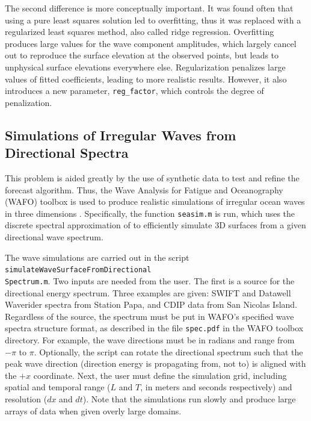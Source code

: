 \documentclass[11pt]{article}
\begin{document}
The second difference is more conceptually important.  It was found often that using a pure least squares solution led to overfitting, thus it was replaced with a regularized least squares method, also called ridge regression.  Overfitting produces large values for the wave component amplitudes, which largely cancel out to reproduce the surface elevation at the observed points, but leads to unphysical surface elevations everywhere else.  Regularization penalizes large values of fitted coefficients,  leading to more realistic results.  However, it also introduces a new parameter, \texttt{reg\_factor}, which controls the degree of penalization.

\subsection{Simulations of Irregular Waves from Directional Spectra}
This problem is aided greatly by the use of synthetic data to test and refine the forecast algorithm.  Thus, the Wave Analysis for Fatigue and Oceanography (WAFO) toolbox is used to produce realistic simulations of irregular ocean waves in three dimensions \citep{WAFO:2000}.  Specifically, the function \texttt{seasim.m} is run, which uses the discrete spectral approximation of \citet{Dietrich:1997} to efficiently simulate 3D surfaces from a given directional wave spectrum.

The wave simulations are carried out in the script \texttt{simulateWaveSurfaceFromDirectional\\Spectrum.m}.  Two inputs are needed from the user.  The first is a source for the directional energy spectrum.  Three examples are given: SWIFT and Datawell Waverider spectra from Station Papa, and CDIP data from San Nicolas Island.  Regardless of the source, the spectrum must be put in WAFO's specified wave spectra structure format, as described in the file \texttt{spec.pdf} in the WAFO toolbox directory.  For example, the wave directions must be in radians and range from $-\pi$ to $\pi$.  Optionally, the script can rotate the directional spectrum such that the peak wave direction (direction energy is propagating from, not to) is aligned with the $+x$ coordinate. Next, the user must define the simulation grid, including spatial and temporal range ($L$ and $T$, in meters and seconds respectively) and resolution ($dx$ and $dt$).  Note that the simulations run slowly and produce large arrays of data when given overly large domains.
\end{document}
